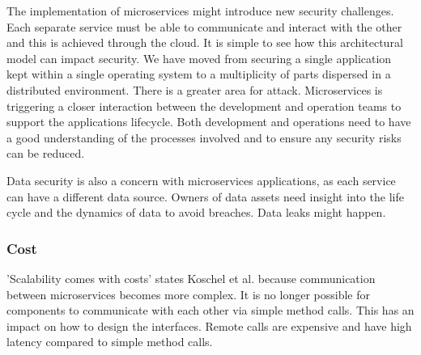 The implementation of microservices might introduce new security challenges. Each separate service must be able to communicate and interact with the other and this is achieved through the cloud. It is simple to see how this architectural model can impact security. We have moved from securing a single application kept within a single operating system to a multiplicity of parts dispersed in a distributed environment. There is a greater area for attack.\cite{Zaytev2018} Microservices is triggering a closer interaction between the development and operation teams to support the applications lifecycle. Both development and operations need to have a good understanding of the processes involved and to ensure any security risks can be reduced.\cite{Aaron2018,Amazon,Gonchar2017}

Data security is also a concern with microservices applications, as each service can have a different data source. Owners of data assets need insight into the life cycle and the dynamics of data to avoid breaches. Data leaks might happen.\cite{tenev2019}


\subsubsection{Cost}%
'Scalability comes with costs' states Koschel et al.\cite{Koschel2017}  because communication between microservices becomes more complex. It is no longer possible for components to communicate with each other via simple method calls. %
This has an impact on how to design the interfaces. 
Remote calls are expensive and have high latency compared to simple method calls.\cite{Koschel2017, McElhiney2018}


